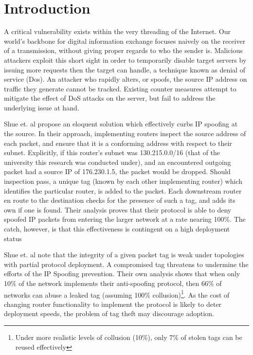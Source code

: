 \documentclass[12pt]{article} %
\begin{document}

\newpage %



\section{Introduction}

A critical vulnerability exists within the very threading of the Internet. Our world's backbone for digital information exchange focuses naively on the receiver of a transmission, without giving proper regards to who the sender is. Malicious attackers exploit this short sight in order to temporarily disable target servers by issuing more requests then the target can handle, a technique known as denial of service (Dos). An attacker who rapidly alters, or spoofs, the source IP address on traffic they generate cannot be tracked. Existing counter measures attempt to mitigate the effect of DoS attacks on the server, but fail to address the underlying issue at hand. 

Shue et. al propose an eloquent solution which effectively curbs IP spoofing at the source. In their approach, implementing routers inspect the source address of each packet, and ensure that it is a conforming address with respect to their subnet\cite{Shue20081567}. Explicitly, if this router's subnet was 130.215.0.0/16 (that of the university this research was conducted under), and an encountered outgoing packet had a source IP of 176.230.1.5, the packet would be dropped. Should inspection pass, a unique tag (known by each other implementing router) which identifies the particular router, is added to the packet. Each downstream router en route to the destination checks for the presence of such a tag, and adds its own if one is found. Their analysis proves that their protocol is able to deny spoofed IP packets from entering the larger network at a rate nearing 100\%. The catch, however, is that this effectiveness is contingent on a high deployment status

Shue et. al note that the integrity of a given packet tag is weak under topologies with partial protocol deployment. A compromised tag threatens to undermine the efforts of the IP Spoofing prevention. Their own analysis shows that when only 10\% of the network implements their anti-spoofing protocol, then 66\% of networks can abuse a leaked tag (assuming 100\% collusion)\cite{Shue20081567}\footnote{Under more realistic levels of collusion (10\%), only 7\% of stolen tags can be reused effectively}. As the cost of changing router functionality to implement the protocol is likely to deter deployment speeds, the problem of tag theft may discourage adoption.
\end{document}
